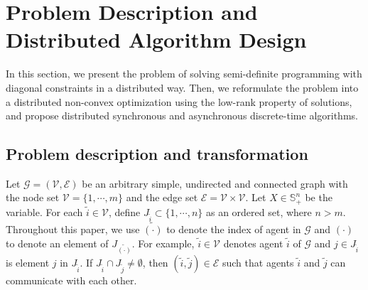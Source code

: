 \documentclass[journal]{IEEEtran}
\newtheorem{remark}{Remark}[section]
\begin{document}
\section{Problem Description and Distributed Algorithm Design}\label{solver_design}

In this section, we present the problem of solving semi-definite programming with diagonal constraints in a  distributed way. Then, we reformulate the problem into a distributed non-convex optimization using the low-rank property of solutions, and propose distributed synchronous and asynchronous discrete-time algorithms.
\subsection{Problem description and transformation}\label{intro_pro_set}


Let $\mathcal{G}=(\mathcal{V},\mathcal{E})$ be an arbitrary simple, undirected and connected graph with the node set $\mathcal{V}=\{1,\cdots,m\}$ and the edge set $\mathcal{E}=\mathcal{V}\times \mathcal{V}$. Let $X\in\mathbb S_+^{n}$ be the variable. For each  $\tilde i\in \mathcal{V}$, define $J_{\tilde{i}}\subset \{1,\cdots,n\}$ as an ordered set, where $n>m$.
Throughout this paper, we use $\tilde{(\cdot)}$ to denote the index of agent in $\mathcal G$ and $(\cdot)$ to denote an element of $J_{\tilde{(\cdot)}}$. For example,  $\tilde i\in \mathcal{V}$ denotes agent $\tilde i$ of $\mathcal G$ and $j\in J_{\tilde{i}}$ is element $j$ in $J_{\tilde{i}}$. If $J_{\tilde{i}}\cap J_{\tilde{j}}\neq \emptyset$, then  $(\tilde{i},\tilde{j})\in \mathcal{E}$  such that  agents $\tilde{i}$ and $\tilde{j}$ can communicate with each other.
\end{document}
